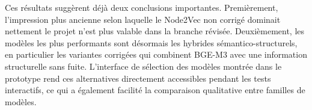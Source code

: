 Ces résultats suggèrent déjà deux conclusions importantes. Premièrement,
l'impression plus ancienne selon laquelle le Node2Vec non corrigé dominait
nettement le projet n'est plus valable dans la branche révisée. Deuxièmement,
les modèles les plus performants sont désormais les hybrides
sémantico-structurels, en particulier les variantes corrigées qui combinent
BGE-M3 avec une information structurelle sans fuite. L'interface de sélection
des modèles montrée dans le prototype rend ces alternatives directement
accessibles pendant les tests interactifs, ce qui a également facilité la
comparaison qualitative entre familles de modèles.

